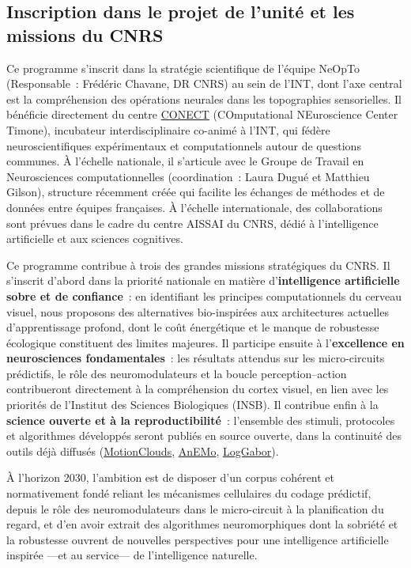\documentclass[10pt,french,a4paper]{article}%
\begin{document}
\subsection{Inscription dans le projet de l'unité et les missions du CNRS}

Ce programme s'inscrit dans la stratégie scientifique de l'équipe NeOpTo (Responsable~: Frédéric Chavane, DR CNRS) au sein de l'INT, dont l'axe central est la compréhension des opérations neurales dans les topographies sensorielles. Il bénéficie directement du centre \href{https://conect-int.github.io/}{CONECT} (COmputational NEuroscience Center Timone), incubateur interdisciplinaire co-animé à l'INT, qui fédère neuroscientifiques expérimentaux et computationnels autour de questions communes. À l'échelle nationale, il s'articule avec le Groupe de Travail en Neurosciences computationnelles (coordination~: Laura Dugué et Matthieu Gilson), structure récemment créée qui facilite les échanges de méthodes et de données entre équipes françaises. À l'échelle internationale, des collaborations sont prévues dans le cadre du centre AISSAI du CNRS, dédié à l'intelligence artificielle et aux sciences cognitives.

Ce programme contribue à trois des grandes missions stratégiques du CNRS. Il s'inscrit d'abord dans la priorité nationale en matière d'\textbf{intelligence artificielle sobre et de confiance}~: en identifiant les principes computationnels du cerveau visuel, nous proposons des alternatives bio-inspirées aux architectures actuelles d'apprentissage profond, dont le coût énergétique et le manque de robustesse écologique constituent des limites majeures. Il participe ensuite à l'\textbf{excellence en neurosciences fondamentales}~: les résultats attendus sur les micro-circuits prédictifs, le rôle des neuromodulateurs et la boucle perception--action contribueront directement à la compréhension du cortex visuel, en lien avec les priorités de l'Institut des Sciences Biologiques (INSB). Il contribue enfin à la \textbf{science ouverte et à la reproductibilité}~: l'ensemble des stimuli, protocoles et algorithmes développés seront publiés en source ouverte, dans la continuité des outils déjà diffusés (\href{https://neuralensemble.github.io/MotionClouds/}{MotionClouds}, \href{https://github.com/invibe/AnEMo}{AnEMo}, \href{http://github.com/bicv/LogGabor}{LogGabor}).

À l'horizon 2030, l'ambition est de disposer d'un corpus cohérent et normativement fondé reliant les mécanismes cellulaires du codage prédictif, depuis le rôle des neuromodulateurs dans le micro-circuit à la planification du regard, et d'en avoir extrait des algorithmes neuromorphiques dont la sobriété et la robustesse ouvrent de nouvelles perspectives pour une intelligence artificielle inspirée ---et au service--- de l'intelligence naturelle.
\newpage
\printbibliography
\end{document}
